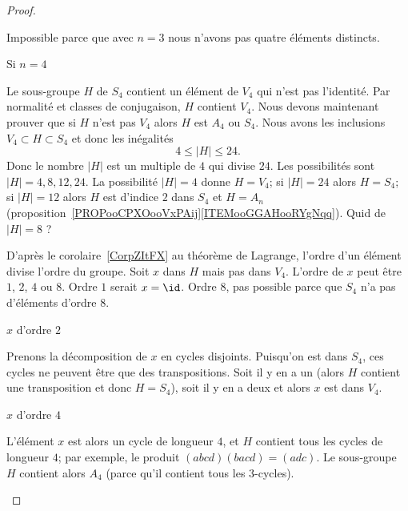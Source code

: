 \begin{proof}
\begin{subproof}
\begin{subproof}
                    Impossible parce que avec \( n=3\) nous n'avons pas quatre éléments distincts.

                \item[Si \( n=4\)]

                    Le sous-groupe \( H\) de \( S_4\) contient un élément de \( V_4\) qui n'est pas l'identité. Par normalité et classes de conjugaison, \( H\) contient \( V_4\). Nous devons maintenant prouver que si \( H\) n'est pas \( V_4\) alors \( H\) est \( A_4\) ou \( S_4\). Nous avons les inclusions \( V_4\subset H\subset S_4\) et donc les inégalités
                    \begin{equation}
                        4\leq | H |\leq 24.
                    \end{equation}
                    Donc le nombre \( | H |\) est un multiple de \( 4\) qui divise \( 24\). Les possibilités sont \( | H |=4,8,12,24\). La possibilité \( | H |=4\) donne \( H=V_4\); si \( |H |=24\) alors \( H=S_4\); si \( | H |=12\) alors \( H\) est d'indice \( 2\) dans \( S_4\) et \( H=A_n\) (proposition~\ref{PROPooCPXOooVxPAij}\ref{ITEMooGGAHooRYgNqq}). Quid de \( | H |=8\) ?

                    D'après le corolaire~\ref{CorpZItFX} au théorème de Lagrange, l'ordre d'un élément divise l'ordre du groupe. Soit \( x\) dans \( H\) mais pas dans \( V_4\). L'ordre de \( x\) peut être \( 1\), \( 2\), \( 4\) ou \( 8\). Ordre \( 1\) serait \( x=\id\). Ordre \( 8\), pas possible parce que \( S_4\) n'a pas d'éléments d'ordre \( 8\).
                    \begin{subproof}
                        \item[\( x\) d'ordre \( 2\)]

                            Prenons la décomposition de \( x\) en cycles disjoints. Puisqu'on est dans \( S_4\), ces cycles ne peuvent être que des transpositions. Soit il y en a un (alors \( H\) contient une transposition et donc \( H=S_4\)), soit il y en a deux et alors \( x\) est dans \( V_4\).

                        \item[\( x\) d'ordre \( 4\)]

                            L'élément \( x\) est alors un cycle de longueur \( 4\), et \( H\) contient tous les cycles de longueur \( 4\); par exemple, le produit \( (abcd)(bacd)=(adc)\). Le sous-groupe \( H\) contient alors \( A_4\) (parce qu'il contient tous les \( 3\)-cycles).
                    \end{subproof}


\end{subproof}
\end{subproof}
\end{proof}
